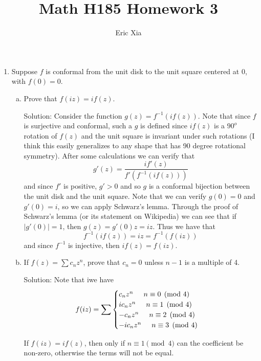 \documentclass[11pt]{article}
\title{Math H185 Homework 3}
\author{Eric Xia}
\begin{document}
\maketitle

\begin{enumerate}[(1)]
\item Suppose $f$ is conformal from the unit disk to the unit square centered at $0$, with $f(0) = 0$.

\begin{enumerate}[(a)]
\item Prove that $f(iz) = if(z)$.

Solution: Consider the function $g(z) = f^{-1}(if(z))$. Note that since $f$ is surjective and conformal, such a $g$ is defined since $if(z)$ is a $90^o$ rotation of $f(z)$ and the unit square is invariant under such rotations (I think this easily generalizes to any shape that has 90 degree rotational symmetry). After some calculations we can verify that 
$$ g'(z) = \frac{if'(z)}{f'(f^{-1}(if(z)))} $$
and since $f'$ is positive, $g' > 0$ and so $g$ is a conformal bijection between the unit disk and the unit square. Note that we can verify $g(0) = 0$ and $g'(0) = i$, so we can apply Schwarz's lemma. Through the proof of Schwarz's lemma (or its statement on Wikipedia) we can see that if $|g'(0)| = 1$, then $g(z) = g'(0)z = iz$. Thus we have that 
$$ f^{-1}(if(z)) = iz = f^{-1}(f(iz)) $$ 
and since $f^{-1}$ is injective, then $if(z) = f(iz)$. 

\item If $f(z) = \sum c_n z^n$, prove that $c_n = 0$ unless $n-1$ is a multiple of 4.

Solution: Note that iwe have 
$$ f(iz) =\sum \begin{cases} 
 c_nz^n \hspace{5mm} n \equiv 0 \pmod{4} \\
ic_nz^n \hspace{5mm} n \equiv 1 \pmod{4} \\
-c_nz^n \hspace{5mm} n \equiv 2 \pmod{4} \\
-ic_nz^n \hspace{5mm} n \equiv 3 \pmod{4}
\end{cases}$$

If $f(iz) = if(z)$, then only if $n \equiv 1 \pmod{4}$ can the coefficient be non-zero, otherwise the terms will not be equal. 

\end{enumerate}


\end{enumerate}
\end{document}
